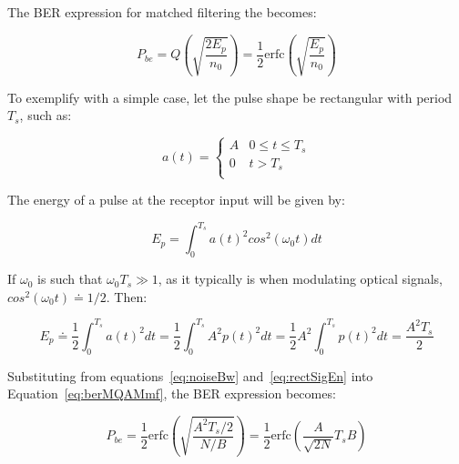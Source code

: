 \begin{refsection}
The BER expression for matched filtering the becomes:

\begin{equation}\label{eq:berMQAMmf}
P_{be} =  Q\left(\sqrt{\frac{2 E_p}{{n_0}}}\right) = \frac{1}{2} \text{erfc}\left(\sqrt{\frac{E_p}{n_0}}\right) 
\end{equation}

To exemplify with a simple case, let the pulse shape be rectangular with period $T_s$, such as:

\begin{equation*}
	a(t) = \begin{cases}
		A               & 0 \le t \le T_s\\
		0               & t > T_s\\
	\end{cases}
\end{equation*}

The energy of a pulse at the receptor input will be given by:

\begin{equation}
E_p = \int_{0}^{T_s} {a(t)^2cos^2(\omega_0 t)} dt 
\end{equation}

If $\omega_0$ is such that $\omega_0 T_s \gg 1$, as it typically is when modulating optical signals, $cos^2(\omega_0 t) \doteq 1/2$. Then:

\begin{equation}\label{eq:rectSigEn}
E_p \doteq \frac{1}{2}\int_{0}^{T_s} a(t)^2 dt = \frac{1}{2}\int_{0}^{T_s} A^2 p(t)^2 dt=\frac{1}{2} A^2 \int_{0}^{T_s} p(t)^2 dt= \frac{A^2 T_s}{2}
\end{equation}

Substituting from equations~\ref{eq:noiseBw} and~\ref{eq:rectSigEn} into Equation~\ref{eq:berMQAMmf}, the BER expression becomes:

\begin{equation}\label{eq:berMod}
P_{be} = \frac{1}{2} \text{erfc}\left(\sqrt{\frac{A^2 T_s / 2}{ N / B}}\right) = 
\frac{1}{2} \text{erfc}\left(\frac{A}{\sqrt{2N}} {{T_s}{B}}\right) 
\end{equation}


%


\end{refsection}

